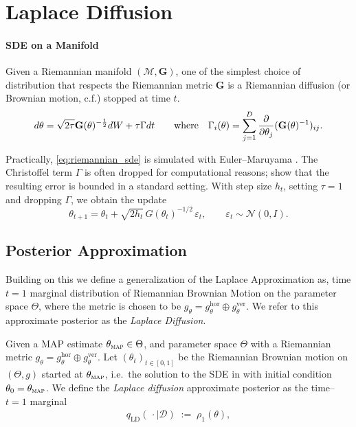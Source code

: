 \section{Laplace Diffusion}
\label{sec:laplace_diffusion}

\paragraph{SDE on a Manifold}
Given a Riemannian manifold $(\mathcal{M}, \mathbf{G})$, one of the simplest choice of distribution that respects the Riemannian metric $\mathbf{G}$ is a Riemannian diffusion (or Brownian motion, c.f.\@ \citet{hsu2002stochastic}) stopped at time $t$.
 \begin{align}
 \label{eq:riemannian_sde}
      d\theta = \sqrt{2\tau}\mathbf{G}(\theta)^{-\frac{1}{2}} dW + \tau \Gamma d t %
      \qquad \textnormal{where} \quad \Gamma_i(\theta) = \sum_{j=1}^D \frac{\partial}{\partial \theta_j} (\mathbf{G}(\theta)^{-1})_{ij}. 
 \end{align}

Practically, \eqref{eq:riemannian_sde} is simulated with Euler--Maruyama \citep{maruyama1955continuous}. The Christoffel term $\Gamma$ is often dropped for computational reasons; \citet{li2015preconditioned} show that the resulting error is bounded in a standard setting. With step size $h_t$, setting $\tau=1$ and dropping $\Gamma$, we obtain the update 
\begin{equation} 
\label{eq:em_update} \theta_{t+1} = \theta_t + \sqrt{2h_t}\,G(\theta_t)^{-1/2}\,\varepsilon_t, \qquad \varepsilon_t\sim\mathcal N(0,I). \end{equation}
\subsection{Posterior Approximation}

Building on this we define a generalization of the Laplace Approximation as, time $t=1$ marginal distribution of Riemannian Brownian Motion on the parameter space $\Theta$, where the metric is chosen to be $g_\theta = g_\theta^\mathrm{hor} \oplus g_\theta^\mathrm{ver}$. We refer to this approximate posterior as the \emph{Laplace Diffusion}. 

\begin{definition}
\label{def:laplace_diffusion}
Given a MAP estimate $\theta_{\textsc{map}}\in\Theta$, and parameter space $\Theta$ with a
Riemannian metric $g_\theta = g_\theta^{\mathrm{hor}}\oplus g_\theta^{\mathrm{ver}}$.
Let $(\theta_t)_{t\in[0,1]}$ be the Riemannian Brownian motion on $(\Theta,g)$ started at $\theta_{\textsc{map}}$,
i.e.\ the solution to the SDE in  with initial condition $\theta_0=\theta_{\textsc{map}}$.
We define the \emph{Laplace diffusion} approximate posterior as the time--$t=1$ marginal
\begin{align}
    q_{\mathrm{LD}}(\,\cdot \mid \mathcal D) \;:=\;\rho_1(\theta),
\end{align}
\end{definition}


